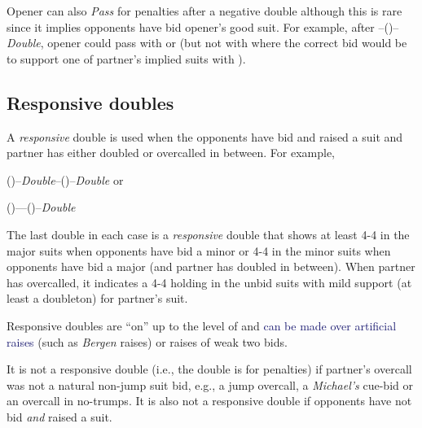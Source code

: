 \documentclass[a4paper,article,oneside]{memoir}
\newcommand{\excp}[1]{\textcolor{MidnightBlue}{#1}} %
\begin{document}
Opener can also \emph{Pass} for penalties after a negative double
although this is rare since it implies opponents have bid opener's
good suit. For example, after --()--\emph{Double}, opener
could pass with  or 
(but not with  where the correct bid would be
to support one of partner's implied suits with ).

\subsection{Responsive doubles}

A \emph{responsive} double is used when the opponents have bid and
raised a suit and partner has either doubled or overcalled in
between. For example,

()--\emph{Double}--()--\emph{Double} or

()----()--\emph{Double}

The last double in each case is a \emph{responsive} double that shows
at least 4-4 in the major suits when opponents have bid a minor or 4-4
in the minor suits when opponents have bid a major (and partner has
doubled in between). When partner has overcalled, it indicates a 4-4
holding in the unbid suits with mild support (at least a doubleton)
for partner's suit.

Responsive doubles are ``on'' up to the level of  and \excp{can be
made over artificial raises} (such as \emph{Bergen} raises) or raises
of weak two bids.

It is not a responsive double (i.e., the double is for penalties) if
partner's overcall was not a natural non-jump suit bid, e.g., a jump
overcall, a \emph{Michael's} cue-bid or an overcall in no-trumps. It
is also not a responsive double if opponents have not bid \emph{and}
raised a suit.
\end{document}
